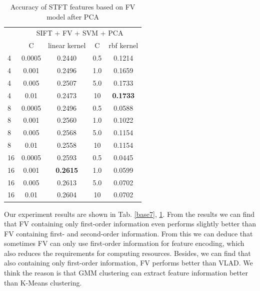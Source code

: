 \documentclass[conference]{IEEEtran}
\begin{document}
\begin{table}[htbp]
	\centering
	\newcommand{\tabincell}[2]{\begin{tabular}{@{}#1@{}}#2\end{tabular}}
	\renewcommand\arraystretch{1.0}
	\caption{Accuracy of STFT features based on FV model after PCA}
	\label{base8}%
	\begin{tabular}{@{}p{1cm}<{\centering}|c|c|c|c}
		\hline
		\multirow{2}{*}{\diagbox[height=2\line,width=1.42cm,font=\tiny]{$k$}{Acc.}{$\mathit{M}$}} &
		\multicolumn{4}{c}{SIFT + FV + SVM + PCA}\\
		\cline{2-5}
		& {C} & {linear kernel} & {C} & {rbf kernel}\\
		\hline
		4   & 0.0005  & 0.2440 & 0.5 & 0.1214\\
		4   & 0.001  & 0.2496 & 1.0 & 0.1659\\
		4   & 0.005  & 0.2507 & 5.0 & 0.1733\\
		4   & 0.01  & 0.2473 & 10 & \textbf{0.1733}\\
		8   & 0.0005 & 0.2496 & 0.5 & 0.0588\\
		8   & 0.001 & 0.2560 & 1.0 & 0.1022\\
		8   & 0.005 & 0.2568 & 5.0 & 0.1154\\
		8   & 0.01  & 0.2558 & 10 & 0.1154\\
		16   & 0.0005  & 0.2593 & 0.5 & 0.0445\\
		16   & 0.001  & \textbf{0.2615} & 1.0 & 0.0599\\
		16   & 0.005  & 0.2613 & 5.0 & 0.0702\\
		16   & 0.01  & 0.2604 & 10 & 0.0702\\
		\hline
	\end{tabular}
\end{table}

Our experiment results are shown in Tab. \ref{base7}, \ref{base8}. From the results we can find that FV containing only first-order information even performs slightly better than FV containing first- and second-order information. From this we can deduce that sometimes FV can only use first-order information for feature encoding, which also reduces the requirements for computing resources. Besides, we can find that also containing only first-order information, FV performs better than VLAD. We think the reason is that GMM clustering can extract feature information better than K-Means clustering.


\end{document}
